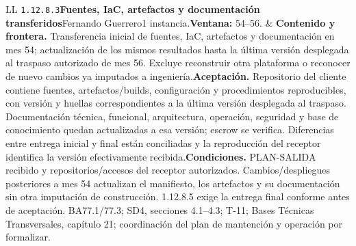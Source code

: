 \begin{longtable}{L{\tabcolsep\relax}L{\tabcolsep\relax}}
\texttt{1.\allowbreak{}12.\allowbreak{}8.\allowbreak{}3}\newline{}\textbf{Fuentes, IaC, artefactos y documentación transferidos}\newline{}Fernando Guerrero\newline{}1 instancia.\newline{}\textbf{Ventana:} 54--56. & \textbf{Contenido y frontera.} Transferencia inicial de fuentes, IaC, artefactos y documentación en mes 54; actualización de los mismos resultados hasta la última versión desplegada al traspaso autorizado de mes 56. Excluye reconstruir otra plataforma o reconocer de nuevo cambios ya imputados a ingeniería.\newline{}\textbf{Aceptación.} Repositorio del cliente contiene fuentes, artefactos/builds, configuración y procedimientos reproducibles, con versión y huellas correspondientes a la última versión desplegada al traspaso. Documentación técnica, funcional, arquitectura, operación, seguridad y base de conocimiento quedan actualizadas a esa versión; escrow se verifica. Diferencias entre entrega inicial y final están conciliadas y la reproducción del receptor identifica la versión efectivamente recibida.\newline{}\textbf{Condiciones.} PLAN-SALIDA recibido y repositorios/accesos del receptor autorizados. Cambios/despliegues posteriores a mes 54 actualizan el manifiesto, los artefactos y su documentación sin otra imputación de construcción. 1.12.8.5 exige la entrega final conforme antes de aceptación. BA77.1/77.3; SD4, secciones 4.1--4.3; T-11; Bases Técnicas Transversales, capítulo 21; coordinación del plan de mantención y operación por formalizar.\\\hline

\end{longtable}

